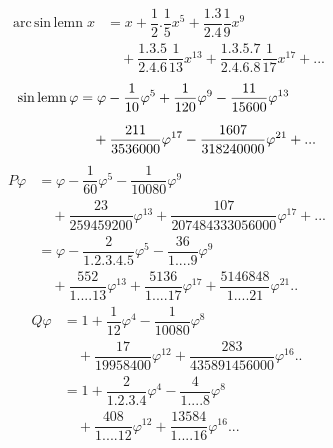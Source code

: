 \[
\begin{aligned}\operatorname{arc\,sin\,lemn}x&=x+\dfrac12.\dfrac15x^5+\dfrac{1.3}{2.4}\dfrac19x^9\\[6pt]&\quad{}+\dfrac{1.3.5}{2.4.6}\dfrac1{13}x^{13}+\dfrac{1.3.5.7}{2.4.6.8}\dfrac1{17}x^{17}+\mathord{.}\mathord{.}\mathord{.}\end{aligned}
\]
\[
\begin{aligned}\operatorname{sin\,lemn}\varphi&=\varphi-\dfrac1{10}\varphi^5+\dfrac1{120}\varphi^9-\dfrac{11}{15600}\varphi^{13}\\[6pt]&\quad{}+\dfrac{211}{3536000}\varphi^{17}-\dfrac{1607}{318240000}\varphi^{21}+\mathord{.}\mathord{.}\mathord{.}\end{aligned}
\]
\[
\begin{aligned}
P\varphi&=\varphi-\dfrac1{60}\varphi^5-\dfrac1{10080}\varphi^9\\[6pt]&\quad{}+\dfrac{23}{259459200}\varphi^{13}+\dfrac{107}{207484333056000}\varphi^{17}+\mathord{.}\mathord{.}\mathord{.}\\[12pt]
&=\varphi-\dfrac2{1.2.3.4.5}\varphi^5-\dfrac{36}{1\mathord{.}\mathord{.}\mathord{.}\mathord{.}9}\varphi^9\\[6pt]&\quad{}+\dfrac{552}{1\mathord{.}\mathord{.}\mathord{.}\mathord{.}13}\varphi^{13}+\dfrac{5136}{1\mathord{.}\mathord{.}\mathord{.}\mathord{.}17}\varphi^{17}+\dfrac{5146848}{1\mathord{.}\mathord{.}\mathord{.}\mathord{.}21}\varphi^{21}\mathord{.}\mathord{.}
\end{aligned}
\]
\[
\begin{aligned}
Q\varphi&=1+\dfrac1{12}\varphi^4-\dfrac1{10080}\varphi^8\\[6pt]&\quad{}+\dfrac{17}{19958400}\varphi^{12}+\dfrac{283}{435891456000}\varphi^{16}\mathord{.}\mathord{.}\\[12pt]
&=1+\dfrac2{1.2.3.4}\varphi^4-\dfrac4{1\mathord{.}\mathord{.}\mathord{.}\mathord{.}8}\varphi^8\\[6pt]&\quad{}+\dfrac{408}{1\mathord{.}\mathord{.}\mathord{.}\mathord{.}12}\varphi^{12}+\dfrac{13584}{1\mathord{.}\mathord{.}\mathord{.}\mathord{.}16}\varphi^{16}\mathord{.}\mathord{.}\mathord{.}
\end{aligned}
\]
